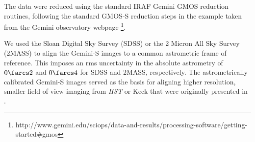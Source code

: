 \documentclass[iop]{emulateapj}
\begin{document}
The data were reduced using the standard {\sc IRAF} Gemini GMOS reduction
routines, following the standard GMOS-S reduction steps in the example taken
from the Gemini observatory webpage
\footnote{http://www.gemini.edu/sciops/data-and-results/processing-software/getting-started\#gmos}.

We used the Sloan Digital Sky Survey (SDSS) or the 2 Micron All Sky Survey
(2MASS) to align the Gemini-S images to a common astrometric frame of
reference.  This imposes an rms uncertainty in the absolute astrometry of
$0\farcs2$ and $0\farcs4$ for SDSS and 2MASS, respectively.  The
astrometrically calibrated Gemini-S images served as the basis for aligning
higher resolution, smaller field-of-view imaging from {\it HST} or Keck that
were originally presented in \citet{Calanog:2014lr}.

%
%

%


\end{document}
